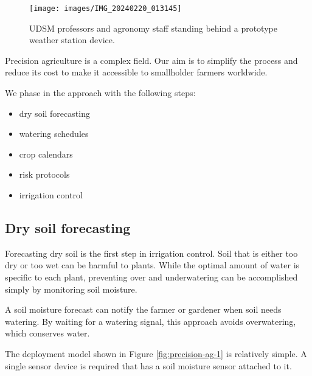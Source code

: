 \documentclass[
]{book}
\providecommand{\tightlist}{%
  \setlength{\itemsep}{0pt}\setlength{\parskip}{0pt}}
\begin{document}
\begin{figure}

{\centering \texttt{[image: images/IMG\_20240220\_013145]} 

}

\caption{UDSM professors and agronomy staff standing behind a prototype weather station device.}\label{fig:unnamed-chunk-4}
\end{figure}

Precision agriculture is a complex field.
Our aim is to simplify the process and reduce its cost to make it accessible
to smallholder farmers worldwide.

We phase in the approach with the following steps:

\begin{itemize}
\tightlist
\item
  dry soil forecasting
\item
  watering schedules
\item
  crop calendars
\item
  risk protocols
\item
  irrigation control
\end{itemize}

\hypertarget{dry-soil-forecasting}{%
\subsection{Dry soil forecasting}\label{dry-soil-forecasting}}

Forecasting dry soil is the first step in irrigation control.
Soil that is either too dry or too wet can be harmful to plants.
While the optimal amount of water is specific to each plant,
preventing over and underwatering can be accomplished simply by monitoring
soil moisture.

A soil moisture forecast can notify the farmer or gardener when soil needs
watering.
By waiting for a watering signal, this approach avoids overwatering,
which conserves water.

The deployment model shown in Figure \ref{fig:precision-ag-1} is relatively
simple. A single sensor device is required that has a soil moisture sensor
attached to it.
\end{document}
